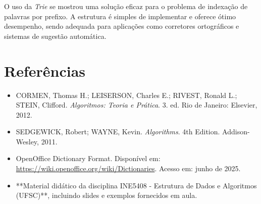 \documentclass[12pt]{article}
\begin{document}
O uso da \textit{Trie} se mostrou uma solução eficaz para o problema de indexação de palavras por prefixo. A estrutura é simples de implementar e oferece ótimo desempenho, sendo adequada para aplicações como corretores ortográficos e sistemas de sugestão automática.

\section{Referências}

\begin{itemize}
    \item CORMEN, Thomas H.; LEISERSON, Charles E.; RIVEST, Ronald L.; STEIN, Clifford. \textit{Algoritmos: Teoria e Prática}. 3. ed. Rio de Janeiro: Elsevier, 2012.
    \item SEDGEWICK, Robert; WAYNE, Kevin. \textit{Algorithms}. 4th Edition. Addison-Wesley, 2011.
    \item OpenOffice Dictionary Format. Disponível em: \url{https://wiki.openoffice.org/wiki/Dictionaries}. Acesso em: junho de 2025.
    \item **Material didático da disciplina INE5408 - Estrutura de Dados e Algoritmos (UFSC)**, incluindo slides e exemplos fornecidos em aula. 
\end{itemize}
\end{document}
